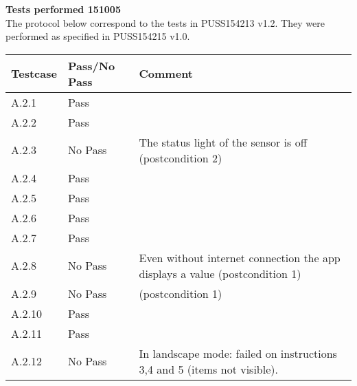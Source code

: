 \renewcommand{\testdate}{151005}
\textbf{Tests performed \testdate} \\
The protocol below correspond to the tests in PUSS154213 v1.2. They were performed as specified in PUSS154215 v1.0.
	\begin{center}
  		\begin{tabular}{| p{3cm} | p{5cm} | p{5cm} |}
    		\hline
	    	\textbf{Testcase}			& \textbf{Pass/No Pass} 	& \textbf{Comment} \\ \hline
    		A.2.1		 						& Pass 								&  				\\ \hline
    		A.2.2		 						& Pass  							& 				 \\	\hline
    		A.2.3		 						& No Pass 							& The status light of the sensor is off (postcondition 2)				 \\	\hline
    		A.2.4		 						& Pass  							& 				 \\	\hline
    		A.2.5		 						& Pass 								& 			 \\	\hline
    		A.2.6		 						& Pass 								& 				 \\	\hline
    		A.2.7		 						& Pass 								& 				 \\	\hline
    		A.2.8		 						& No Pass 							& Even without internet connection the app displays a value (postcondition 1)			 \\	\hline
    		A.2.9		 						& No Pass 							& (postcondition 1)				 \\	\hline
    		A.2.10	 							& Pass 								& 				 \\	\hline
    		A.2.11	 							& Pass 								& 				 \\	\hline
    		A.2.12	 							& No Pass 								& In landscape mode: failed on instructions 3,4 and 5 (items not visible). 				 \\	\hline
 		 \end{tabular}
	\end{center}